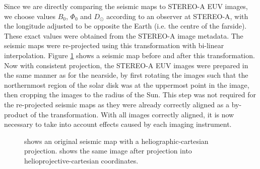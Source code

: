 \documentclass[11pt,a4paper,onecolumn]{report}
\begin{document}
Since we are directly comparing the seismic maps to STEREO-A EUV images, we
choose values \(B_0\), \(\Phi_0\) and \(D_\odot\) according to an observer at
STEREO-A, with the longitude adjusted to be opposite the Earth (i.e. the centre
of the farside). These exact values were obtained from the STEREO-A image
metadata. The seismic maps were re-projected using this transformation with
bi-linear interpolation. Figure \ref{fig:projection} shows a seismic map before
and after this transformation. \\

Now with consistent projection, the STEREO-A EUV images were prepared in the
same manner as for the nearside, by first rotating the images such that the
northernmost region of the solar disk was at the uppermost point in the image,
then cropping the images to the radius of the Sun. This step was not required
for the re-projected seismic maps as they were already correctly aligned as a
by-product of the transformation. With all images correctly aligned, it
is now necessary to take into account effects caused by each imaging instrument.

\begin{figure}[t]%
  \centering
  \qquad

  \caption[]{ shows an original seismic map with a
  heliographic-cartesian projection.  shows the same
  image after projection into helioprojective-cartesian coordinates.}
  \label{fig:projection}
\end{figure}
\end{document}
